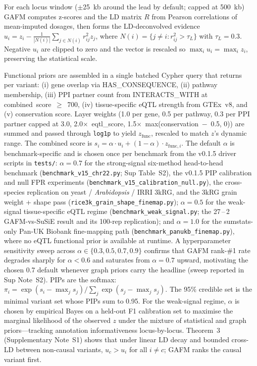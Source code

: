 For each locus window ($\pm$25~kb around the lead by default; capped
at 500~kb) GAFM computes z-scores and the LD matrix $R$ from Pearson
correlations of mean-imputed dosages, then forms the LD-deconvolved
evidence
$u_i = z_i - \frac{1}{|N(i)|} \sum_{j \in N(i)} r^2_{ij} z_j$,
where $N(i) = \{j \ne i : r^2_{ij} > \tau_L\}$ with $\tau_L = 0.3$.
Negative $u_i$ are clipped to zero and the vector is rescaled so
$\max_i u_i = \max_i z_i$, preserving the statistical scale.

Functional priors are assembled in a single batched Cypher query
that returns per variant: (i) gene overlap via HAS\_CONSEQUENCE,
(ii) pathway membership, (iii) PPI partner count from
INTERACTS\_WITH at combined~score~$\geq$~700, (iv) tissue-specific
eQTL strength from GTEx~v8, and (v) conservation score. Layer
weights (1.0 per gene, 0.5 per pathway, 0.3 per PPI partner capped
at 3.0, 2.0$\times$~eqtl\_score, 1.5$\times$~max(conservation~$-$~0.5, 0))
are summed and passed through \texttt{log1p} to yield $z_{\text{func}}$,
rescaled to match $z$'s dynamic range. The combined score is
$s_i = \alpha \cdot u_i + (1-\alpha) \cdot z_{\text{func},i}$.
The default $\alpha$ is benchmark-specific and is chosen once per
benchmark from the v0.1.5 driver scripts in \texttt{tests/}:
$\alpha{=}0.7$ for the strong-signal six-method head-to-head
benchmark (\texttt{benchmark\_v15\_chr22.py}; Sup Table~S2), the
v0.1.5 PIP calibration and null FPR experiments
(\texttt{benchmark\_v15\_calibration\_null.py}), the cross-species
replication on yeast / \emph{Arabidopsis} / IRRI 3kRG, and the
3kRG grain weight + shape pass
(\texttt{rice3k\_grain\_shape\_finemap.py}); $\alpha{=}0.5$ for
the weak-signal tissue-specific eQTL regime
(\texttt{benchmark\_weak\_signal.py}; the 27\,--\,2 GAFM-vs-SuSiE
result and its 100-rep replication); and $\alpha{=}1.0$ for the
sumstats-only Pan-UK Biobank fine-mapping path
(\texttt{benchmark\_panukb\_finemap.py}), where no eQTL
functional prior is available at runtime. A hyperparameter
sensitivity sweep across $\alpha \in \{0.3, 0.5, 0.7, 0.9\}$
confirms that GAFM rank-\#1 rate degrades sharply for
$\alpha < 0.6$ and saturates from $\alpha{=}0.7$ upward, motivating
the chosen 0.7 default whenever graph priors carry the headline
(sweep reported in Sup Note~S2). PIPs are the softmax:
$\pi_i = \exp(s_i - \max_j s_j) / \sum_j \exp(s_j - \max_j s_j)$.
The 95\% credible set is the minimal variant set whose PIPs sum to
0.95. For the weak-signal regime, $\alpha$ is chosen by empirical
Bayes on a held-out F1 calibration set to maximise the marginal
likelihood of the observed $z$ under the mixture of statistical and
graph priors---tracking annotation informativeness locus-by-locus.
Theorem~3 (Supplementary Note~S1) shows that under linear LD decay
and bounded cross-LD between non-causal variants, $u_c > u_i$ for
all $i \ne c$; GAFM ranks the causal variant first.


